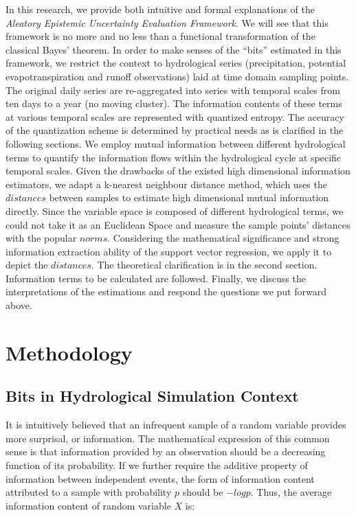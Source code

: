 \documentclass[review]{elsarticle}
\begin{document}
In this research, we provide both intuitive and formal explanations of the \emph{Aleatory Epistemic Uncertainty Evaluation Framework}. We will see that this framework is no more and no less than a  functional transformation of the classical Bayes' theorem. In order to make senses of the ``bits'' estimated in this framework, we restrict the context to hydrological series (precipitation, potential evapotranspiration and runoff observations) laid at time domain sampling points. The original daily series are re-aggregated into series with temporal scales from ten days to a year (no moving cluster). The information contents of these terms at various temporal scales are represented with quantized entropy. The accuracy of the quantization scheme is determined by practical needs as is clarified in the following sections. We employ mutual information between different hydrological terms to quantify the information flows within the hydrological cycle at specific temporal scales. Given the drawbacks of the existed high dimensional information estimators, we adapt a k-nearest neighbour distance method\citep{kraskov2004estimating}, which uses the $distances$ between samples to estimate high dimensional mutual information directly. Since the variable space is composed of different hydrological terms, we could not take it as an Euclidean Space and measure the sample points' distances with the popular $norms$. Considering the mathematical significance and strong information extraction ability of the support vector regression\citep{cortes1995support}, we apply it to depict the $distances$. The theoretical clarification is in the second section. Information terms to be calculated are followed. Finally, we discuss the interpretations of the estimations and respond the questions we put forward above.





\section{Methodology}
\subsection{Bits in Hydrological Simulation Context}

It is intuitively believed that an infrequent sample of a random variable provides more surprisal, or information. The  mathematical expression of this common sense is that information provided by an observation should be a decreasing function of its probability. If we further require the additive property of information between independent events, the form of information content attributed to a sample with probability $p$ should be $-logp$. Thus, the average information content of random variable $X$ is:
\end{document}
